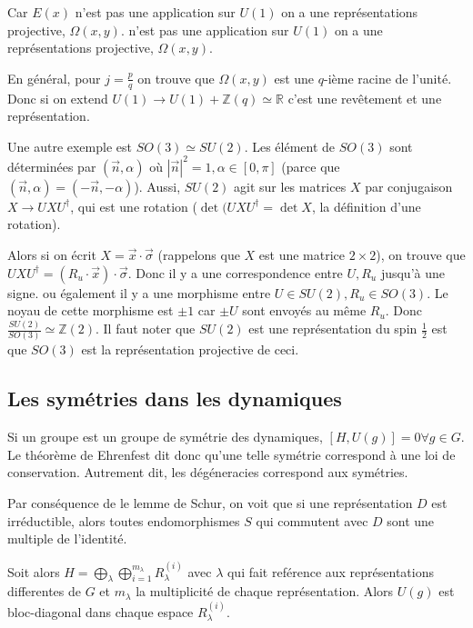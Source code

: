 \documentclass[10pt]{report}
\newcommand{\abs}[1]{\left|#1\right|}
\begin{document}
Car $E(x)$ n'est pas une application sur $U(1)$ on a une repr\'esentations projective, $\Omega(x,y)$.  n'est pas une application sur $U(1)$ on a une repr\'esentations projective, $\Omega(x,y)$. 

En g\'en\'eral, pour $j = \frac{p}{q}$ on trouve que $\Omega(x,y)$ est une $q$-i\`eme racine de l'unit\'e. Donc si on extend $U(1) \to U(1) + \mathbb{Z}(q) \simeq \mathbb{R}$ c'est une rev\^etement et une repr\'esentation.

Une autre exemple est $SO(3) \simeq SU(2)$. Les \'el\'ement de $SO(3)$ sont d\'etermin\'ees par $(\vec{n},\alpha)$ o\`u $\abs{\vec{n}}^2 = 1, \alpha \in [0,\pi]$ (parce que $(\vec{n},\alpha) = (-\vec{n}, -\alpha)$). Aussi, $SU(2)$ agit sur les matrices $X$ par conjugaison $X \to UXU^\dagger$, qui est une rotation ($\det(UXU^\dagger = \det X$, la d\'efinition d'une rotation). 

Alors si on \'ecrit $X = \vec{x} \cdot \vec{\sigma}$ (rappelons que $X$ est une matrice $2 \times 2$), on trouve que $UXU^\dagger = (R_u \cdot \vec{x}) \cdot \vec{\sigma}$. Donc il y a une correspondence entre $U, R_u$ jusqu'\`a une signe. ou \'egalement il y a une morphisme entre $U \in SU(2), R_u \in SO(3)$. Le noyau de cette morphisme est $\pm 1$ car $\pm U$ sont envoy\'es au m\^eme $R_u$. Donc $\frac{SU(2)}{SO(3)} \simeq \mathbb{Z}(2)$. Il faut noter que $SU(2)$ est une repr\'esentation du spin $\frac{1}{2}$ est que $SO(3)$ est la repr\'esentation projective de ceci.

\subsection{Les sym\'etries dans les dynamiques}

Si un groupe est un groupe de sym\'etrie des dynamiques, $\left[ H, U(g) \right] = 0 \forall g \in G$. Le th\'eor\`eme de Ehrenfest dit donc qu'une telle sym\'etrie correspond \`a une loi de conservation. Autrement dit, les d\'eg\'eneracies correspond aux sym\'etries.

Par cons\'equence de le lemme de Schur, on voit que si une repr\'esentation $D$ est irr\'eductible, alors toutes endomorphismes $S$ qui commutent avec $D$ sont une multiple de l'identit\'e.

Soit alors $H = \bigoplus_\lambda \bigoplus_{i=1}^{m_\lambda}R_\lambda^{(i)}$ avec $\lambda$ qui fait ref\'erence aux repr\'esentations differentes de $G$ et $m_\lambda$ la multiplicit\'e de chaque repr\'esentation. Alors $U\left( g\right)$ est bloc-diagonal dans chaque espace $R_\lambda^{(i)}$.
\end{document}
